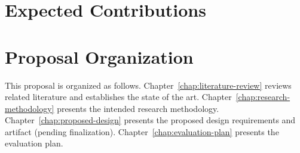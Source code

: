 \section{Expected Contributions}
\label{sec:expected-contributions}

\section{Proposal Organization}
\label{sec:proposal-organization}
This proposal is organized as follows. Chapter~\ref{chap:literature-review} reviews related literature and establishes the state of the art. Chapter~\ref{chap:research-methodology} presents the intended research methodology. Chapter~\ref{chap:proposed-design} presents the proposed design requirements and artifact (pending finalization). Chapter~\ref{chap:evaluation-plan} presents the evaluation plan.

